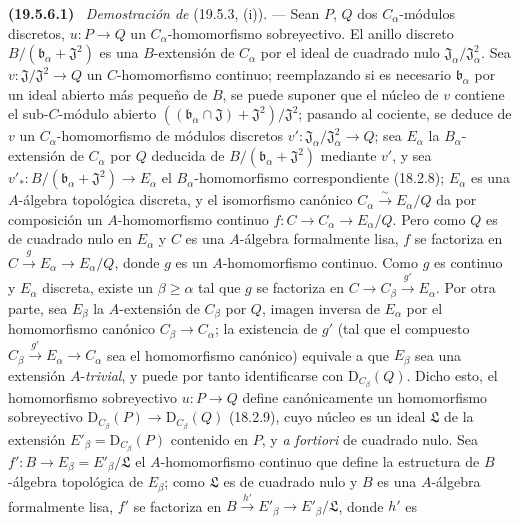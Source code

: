 \documentclass[10pt,oneside]{book}
\makeatletter
\newcommand{\setmanualcurrentlabel}[1]{\def\@currentlabel{#1}}
\newenvironment{env}[1][]{\setmanualcurrentlabel{#1}\par\medskip\noindent\textbf{(#1)}\ }{\par}
\makeatother
\begin{document}
\begin{env}[19.5.6.1]
\label{0.19.5.6.1-es}
\emph{Demostración de} (19.5.3, (i)). --- Sean $P$, $Q$ dos $C_\alpha$-módulos discretos,
$u:P\to Q$ un $C_\alpha$-homomorfismo sobreyectivo. El anillo discreto
$B/(\mathfrak b_\alpha+\mathfrak J^2)$ es una $B$-extensión de $C_\alpha$ por
el ideal de cuadrado nulo $\mathfrak J_\alpha/\mathfrak J_\alpha^2$. Sea
$v:\mathfrak J/\mathfrak J^2\to Q$ un $C$-homomorfismo continuo; reemplazando
si es necesario $\mathfrak b_\alpha$ por un ideal abierto más pequeño de $B$, se puede
suponer que el núcleo de $v$ contiene el sub-$C$-módulo abierto
$((\mathfrak b_\alpha\cap\mathfrak J)+\mathfrak J^2)/\mathfrak J^2$;
pasando al cociente, se deduce de $v$ un $C_\alpha$-homomorfismo de módulos
discretos $v':\mathfrak J_\alpha/\mathfrak J_\alpha^2\to Q$; sea
$E_\alpha$ la $B_\alpha$-extensión de $C_\alpha$ por $Q$ deducida de
$B/(\mathfrak b_\alpha+\mathfrak J^2)$ mediante $v'$, y sea
$v'_*:B/(\mathfrak b_\alpha+\mathfrak J^2)\to E_\alpha$ el
$B_\alpha$-homomorfismo correspondiente (18.2.8); $E_\alpha$ es una
$A$-álgebra topológica discreta, y el isomorfismo canónico
$C_\alpha\xrightarrow{\sim}E_\alpha/Q$ da por composición un
$A$-homomorfismo continuo $f:C\to C_\alpha\to E_\alpha/Q$. Pero como $Q$ es
de cuadrado nulo en $E_\alpha$ y $C$ es una $A$-álgebra formalmente
lisa, $f$ se factoriza en $C\xrightarrow{g}E_\alpha\to E_\alpha/Q$, donde $g$
es un $A$-homomorfismo continuo. Como $g$ es continuo y $E_\alpha$ discreta,
existe un $\beta\geq\alpha$ tal que $g$ se factoriza en
$C\to C_\beta\xrightarrow{g'}E_\alpha$. Por otra parte, sea $E_\beta$ la
$A$-extensión de $C_\beta$ por $Q$, imagen inversa de $E_\alpha$ por
el homomorfismo canónico $C_\beta\to C_\alpha$; la existencia de $g'$ (tal que
el compuesto $C_\beta\xrightarrow{g'}E_\alpha\to C_\alpha$ sea el homomorfismo canónico)
equivale a que $E_\beta$ sea una extensión $A$-\emph{trivial}, y puede
por tanto identificarse con $\mathrm D_{C_\beta}(Q)$. Dicho esto, el homomorfismo
sobreyectivo $u:P\to Q$ define canónicamente un homomorfismo sobreyectivo
$\mathrm D_{C_\beta}(P)\to\mathrm D_{C_\beta}(Q)$ (18.2.9), cuyo núcleo es
un ideal $\mathfrak L$ de la extensión $E'_\beta=\mathrm D_{C_\beta}(P)$
contenido en $P$, y \emph{a fortiori} de cuadrado nulo. Sea
$f':B\to E_\beta=E'_\beta/\mathfrak L$ el $A$-homomorfismo continuo que define
la estructura de $B$-álgebra topológica de $E_\beta$; como $\mathfrak L$ es
de cuadrado nulo y $B$ es una $A$-álgebra formalmente lisa, $f'$ se
factoriza en $B\xrightarrow{h'}E'_\beta\to E'_\beta/\mathfrak L$, donde $h'$ es

\end{env}
\end{document}
